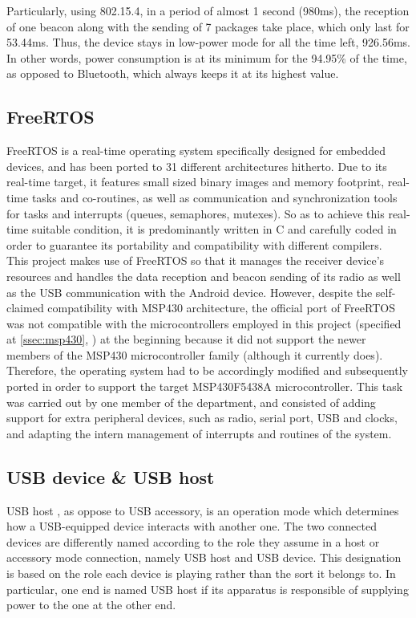 			Particularly, using 802.15.4, in a period of almost 1 second (980ms), the reception of one beacon
			along with the sending of 7 packages take place, which only last for 53.44ms. Thus, the device stays in
			low-power mode for all the time left, 926.56ms. In other words, power consumption is at its minimum
			for the 94.95\% of the time, as opposed to Bluetooth, which always keeps it at its highest value.


		\subsection{FreeRTOS}
		\label{ssec:FreeRTOS}
			FreeRTOS is a real-time operating system specifically designed for embedded devices, and has been
			ported to 31 different architectures hitherto. Due to its real-time target, it features small sized
			binary images and memory footprint, real-time tasks and co-routines, as well as communication and synchronization tools for tasks and interrupts (queues, semaphores, mutexes). So as to achieve this
			real-time suitable condition, it is predominantly written in C and carefully coded in order to
			guarantee its portability and compatibility with different compilers.\\

			This project makes use of FreeRTOS so that it manages the receiver device's resources and handles
			the data reception and beacon sending of its radio as well as the USB communication with the Android
			device. However, despite the self-claimed compatibility with MSP430 architecture, the official port
			of FreeRTOS was not compatible with the microcontrollers employed in this project (specified at
			\autoref{ssec:msp430}, ) at the beginning because it did not support the
			newer members of the MSP430 microcontroller family (although it currently does).\\

			Therefore, the operating system had to be accordingly modified and subsequently ported in order to
			support the target MSP430F5438A microcontroller. This task was carried out by one member of the department,
			and consisted of adding support for extra peripheral devices, such as radio, serial port, USB
			and clocks, and adapting the intern management of interrupts and routines of the system.\\

		
		\subsection{USB device \& USB host}
			USB host \cite{usbhost}, as oppose to USB accessory, is an operation mode which determines how a
			USB-equipped device interacts with another one. The two connected devices are differently named
			according to the role they assume in a host or accessory mode connection, namely USB host and USB
			device. This designation is based on the role each device is playing rather than the sort it belongs
			to. In particular, one end is named USB host if its apparatus is responsible of supplying power to
			the one at the other end.\\

